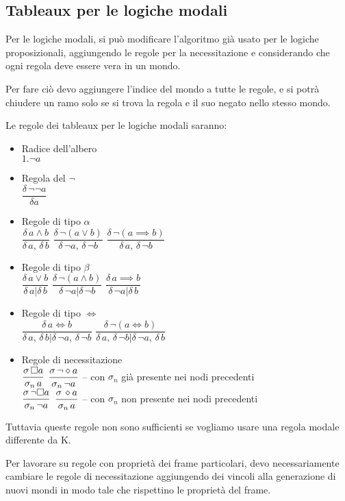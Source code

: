 \subsection{Tableaux per le logiche modali}

Per le logiche modali, si può modificare l'algoritmo già usato per
le logiche proposizionali, aggiungendo le regole per la necessitazione
e considerando che ogni regola deve essere vera in un mondo.

Per fare ciò devo aggiungere l'indice del mondo a tutte le regole,
e si potrà chiudere un ramo solo se si trova la regola e il suo negato
nello stesso mondo.

Le regole dei tableaux per le logiche modali saranno:
\begin{itemize}
\item Radice dell'albero\\
$1.\neg a$
\item Regola del $\neg$\\
$\dfrac{\delta\,\neg\neg a}{\delta a}$
\item Regole di tipo $\alpha$\\
$\dfrac{\delta\, a\wedge b}{\delta\, a,\,\delta\, b}$ $\dfrac{\delta\,\neg(a\vee b)}{\delta\,\neg a,\,\delta\,\neg b}$
$\dfrac{\delta\,\neg(a\implies b)}{\delta\, a,\,\delta\,\neg b}$
\item Regole di tipo $\beta$\\
$\dfrac{\delta\, a\vee b}{\delta\, a|\delta\, b}$ $\dfrac{\delta\,\neg(a\wedge b)}{\delta\,\neg a|\delta\,\neg b}$
$\dfrac{\delta\, a\implies b}{\delta\,\neg a|\delta\, b}$
\item Regole di tipo $\iff$\\
$\dfrac{\delta\, a\iff b}{\delta\, a,\,\delta\, b|\delta\,\neg a,\,\delta\,\neg b}$
$\dfrac{\delta\,\neg(a\iff b)}{\delta\, a,\,\delta\,\neg b|\delta\,\neg a,\,\delta\, b}$
\item Regole di necessitazione\\
$\dfrac{\sigma\,\square a}{\sigma_{n}\, a}$ $\dfrac{\sigma\,\neg\diamond a}{\sigma_{n}\,\neg a}$
-- con $\sigma_{n}$ già presente nei nodi precedenti\\
$\dfrac{\sigma\,\neg\square a}{\sigma_{n}\,\neg a}$ $\dfrac{\sigma\,\diamond a}{\sigma_{n}\, a}$
-- con $\sigma_{n}$ non presente nei nodi precedenti
\end{itemize}
Tuttavia queste regole non sono sufficienti se vogliamo usare una
regola modale differente da K.

Per lavorare su regole con proprietà dei frame particolari, devo necessariamente
cambiare le regole di necessitazione aggiungendo dei vincoli alla
generazione di nuovi mondi in modo tale che rispettino le proprietà
del frame.


